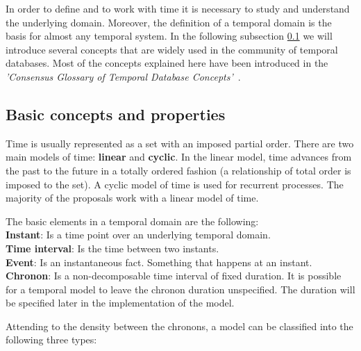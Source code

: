 %
%
In order to define and to work with time it is necessary to study and understand the underlying domain. Moreover, the definition of a temporal domain is the basis for almost any temporal system. In the following subsection \ref{subsec:basic-concepts} we will introduce several concepts that are widely used in the community of temporal databases. Most of the concepts explained here have been introduced in the \emph{'Consensus Glossary of Temporal Database Concepts'}~\cite{Dyreson:1994:CGT:181550.181560}.



\subsection{Basic concepts and properties}
\label{subsec:basic-concepts}

Time is usually represented as a set with an imposed partial order. There are two main models of time: \textbf{linear} and \textbf{cyclic}. In the linear model, time advances from the past to the future in a totally ordered fashion (a relationship of total order is imposed to the set). A cyclic model of time is used for recurrent processes. The majority of the proposals work with a linear model of time.

\begin{svgraybox}
The basic elements in a temporal domain are the following:\\
\textbf{Instant}:  Is a time point over an underlying temporal domain.\\
\textbf{Time interval}: Is the time between two instants.\\
\textbf{Event}: Is an instantaneous fact. Something that happens at an instant.\\
\textbf{Chronon}: Is a non-decomposable time interval of fixed duration. It is possible for a temporal model to leave the chronon duration unspecified. The duration will be specified later in the implementation of the model.
\end{svgraybox}

Attending to the density between the chronons, a model can be classified into the following three types:

